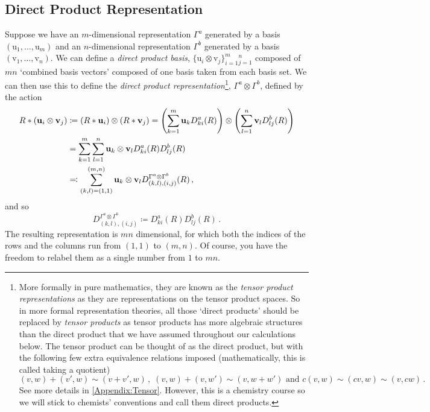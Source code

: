 \documentclass{article}
\theoremstyle{plain}\theoremheaderfont{\normalfont\itshape}\theorembodyfont{\rmfamily}\theoremseparator{.}\newtheorem*{rem}{Remark}\newtheorem*{ex}{Example}\newtheorem*{proof}{Proof}\newtheorem*{altp}{Alternative proof}
\theoremstyle{plain}\theoremheaderfont{\normalfont\bfseries}\theorembodyfont{\rmfamily}\theoremseparator{.}\newtheorem{thm}{Theorem}[section]\newtheorem{lem}[thm]{Lemma}\newtheorem{prop}[thm]{Proposition}\newtheorem*{cor}{Corollary}\newtheorem{defn}[thm]{Definition}\newtheorem{clm}[thm]{Claim}\newtheorem{clminproof}{Claim}\newtheorem*{law}{Law}\newtheorem{pos}[thm]{Postulate}
\theoremstyle{break}\theoremheaderfont{\normalfont\itshape}\theorembodyfont{\rmfamily}\theoremseparator{.\medskip}\newtheorem*{proofskip}{Proof}\newtheorem*{exs}{Examples}\newtheorem*{rems}{Remarks}
\theoremstyle{break}\theoremheaderfont{\normalfont\bfseries}\theorembodyfont{\rmfamily}\theoremseparator{.\medskip}\newtheorem{lemskip}[thm]{Lemma}\newtheorem{defnskip}[thm]{Definition}\newtheorem{propskip}[thm]{Proposition}\newtheorem{thmskip}[thm]{Theorem}
\numberwithin{equation}{section}
\newcommand{\vb}[1]{\bm{\mathrm{#1}}}
\begin{document}
    \subsection{Direct Product Representation}
    Suppose we have an \(m\)-dimensional representation \(\Gamma^{a}\) generated by a basis \((\vb{u}_1,\dots,\vb{u}_m)\) and an \(n\)-dimensional representation \(\Gamma^b\) generated by a basis \((\vb{v}_1,\dots,\vb{v}_n)\). We can define a \textit{direct product basis}, \(\{\vb{u}_i\otimes\vb{v}_j\}_{i=1}^{m}{}_{j=1}^{n}\) composed of \(mn\) `combined basis vectors' composed of one basis taken from each basis set. We can then use this to define the \textit{direct product representation}\footnote{More formally in pure mathematics, they are known as the \textit{tensor product representations} as they are representations on the tensor product spaces. So in more formal representation theories, all those `direct products' should be replaced by \textit{tensor products} as tensor products has more algebraic structures than the direct product that we have assumed throughout our calculations below. The tensor product can be thought of as the direct product, but with the following few extra equivalence relations imposed (mathematically, this is called taking a quotient)
    \begin{equation}
        (v,w)+(v',w)\sim(v+v',w)\,,\; (v,w)+(v,w')\sim(v,w+w')\text{ and } c(v,w)\sim(cv,w)\sim(v,cw)\,.
    \end{equation}
    See more details in \cref{Appendix:Tensor}. However, this is a chemistry course so we will stick to chemists' conventions and call them direct products.}, \(\Gamma^{a}\otimes\Gamma^{b}\), defined by the action
    \begin{align}
        R*(\vb{u}_i\otimes\vb{v}_j)&\coloneqq(R*\vb{u}_i)\otimes(R*\vb{v}_j)=\left(\sum_{k=1}^{m}\vb{u}_k D_{ki}^{a}(R)\right)\otimes\left(\sum_{l=1}^{n}\vb{v}_l D_{lj}^{b}(R)\right)\notag\\
        &=\sum_{k=1}^{m}\sum_{l=1}^{n}\vb{u}_k\otimes\vb{v}_l D_{ki}^{a}(R) D_{lj}^{b}(R)\notag\\
        &\eqqcolon \sum_{(k,l)=(1,1)}^{(m,n)}\vb{u}_k\otimes\vb{v}_l D_{(k,l),(i,j)}^{\Gamma^{a}\otimes\Gamma^{b}}(R)\,,
    \end{align}
    and so
    \begin{equation}
        D_{(k,l),(i,j)}^{\Gamma^{a}\otimes\Gamma^{b}}\coloneqq D_{ki}^{a}(R) D_{lj}^{b}(R)\,.
    \end{equation}
    The resulting representation is \(mn\) dimensional, for which both the indices of the rows and the columns run from \((1,1)\) to \((m,n)\). Of course, you have the freedom to relabel them as a single number from \(1\) to \(mn\).
\end{document}
